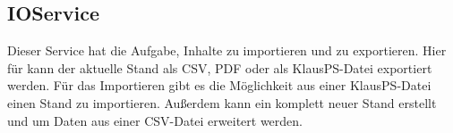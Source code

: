 \subsection{IOService}\label{subsec:ioservice}
Dieser Service hat die Aufgabe, Inhalte zu importieren und zu exportieren.
Hier für kann der aktuelle Stand als CSV, PDF oder als KlausPS-Datei exportiert werden.
Für das Importieren gibt es die Möglichkeit aus einer KlausPS-Datei einen Stand zu importieren.
Außerdem kann ein komplett neuer Stand erstellt und um Daten aus einer CSV-Datei erweitert werden.
